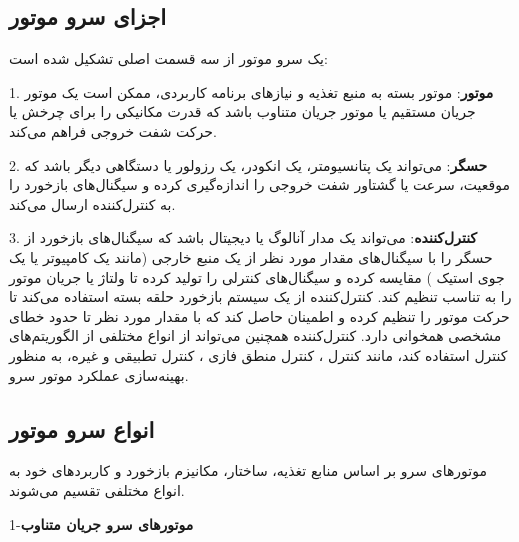 \subsection{اجزای سرو موتور}
یک سرو موتور از سه قسمت اصلی تشکیل شده است:

1. \textbf{موتور}: موتور بسته به منبع تغذیه و نیازهای برنامه کاربردی، ممکن است یک موتور جریان مستقیم
\unskip{}
یا موتور جریان متناوب
\unskip{}
باشد که قدرت مکانیکی را برای چرخش یا حرکت شفت خروجی فراهم می‌کند.

2. \textbf{حسگر}: می‌تواند یک پتانسیومتر، یک انکودر، یک رزولور یا دستگاهی دیگر باشد که موقعیت، سرعت یا گشتاور شفت خروجی را اندازه‌گیری کرده و سیگنال‌های بازخورد را به کنترل‌کننده ارسال می‌کند.

3. \textbf{کنترل‌کننده}: می‌تواند یک مدار آنالوگ یا دیجیتال باشد که سیگنال‌های بازخورد از حسگر را با سیگنال‌های مقدار مورد نظر از یک منبع خارجی (مانند یک کامپیوتر یا یک جوی استیک
\unskip{}
) مقایسه کرده و سیگنال‌های کنترلی را تولید کرده تا ولتاژ یا جریان موتور را به تناسب تنظیم کند. کنترل‌کننده از یک سیستم بازخورد حلقه بسته
\unskip{}
استفاده می‌کند تا حرکت موتور را تنظیم کرده و اطمینان حاصل کند که با مقدار مورد نظر تا حدود خطای مشخصی همخوانی دارد. کنترل‌کننده همچنین می‌تواند از انواع مختلفی از الگوریتم‌های کنترل استفاده کند، مانند کنترل
، کنترل منطق فازی
\unskip{}
، کنترل تطبیقی
\unskip{}
و غیره، به منظور بهینه‌سازی عملکرد موتور سرو.
\subsection{انواع سرو موتور}

موتورهای سرو بر اساس منابع تغذیه، ساختار، مکانیزم بازخورد و کاربردهای خود به انواع مختلفی تقسیم می‌شوند.

1-\textbf{موتورهای سرو جریان متناوب}

